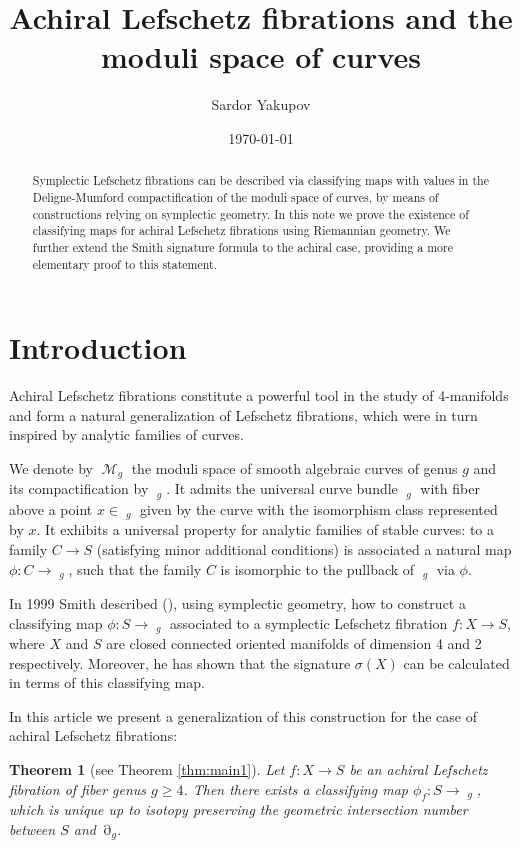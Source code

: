 \documentclass{article}
\title{Achiral Lefschetz fibrations and the moduli space of curves}
\author{Sardor Yakupov}
\date{\today}
\DeclareMathOperator{\dm}{\overline{\mathcal{M}}}
\DeclareMathOperator{\m}{\mathcal{M}}
\DeclareMathOperator{\scr}{\overline{\mathcal{C}}}
\DeclareMathOperator{\sdiv}{\partial \dm}
\theoremstyle{plain}
\newtheorem{theorem}{Theorem}
\theoremstyle{remark}
\theoremstyle{definition}
\begin{document}
\maketitle
\begin{abstract}
Symplectic Lefschetz fibrations can be described via classifying maps with values in the Deligne-Mumford compactification of the moduli space of curves, by means of constructions relying on symplectic geometry. In this note we prove the existence of classifying maps for achiral Lefschetz fibrations using Riemannian geometry. We further extend the Smith signature formula to the achiral case, providing a more elementary proof to this statement.
\end{abstract}
\tableofcontents
\newpage
\section{Introduction}
Achiral Lefschetz fibrations constitute a powerful tool in the study of 4-manifolds and form a natural generalization of Lefschetz fibrations, which were in turn inspired by analytic families of curves. \par 
We denote by $\m_g$ the moduli space of smooth algebraic curves of genus $g$ and its compactification by $\dm_g$. It admits the universal curve bundle $\scr_g$ with fiber above a point $x\in \dm_g$ given by the curve with the isomorphism class represented by $x$. It exhibits a universal property for analytic families of stable curves\thinspace: to a family $C\to S$ (satisfying minor additional conditions) is associated a natural map $\phi:C\to \dm_g$, such that the family $C$ is isomorphic to the pullback of $\scr_g$ via $\phi$.\par 
In 1999 Smith described (\cite{Smith1}), using symplectic geometry, how to construct a classifying map $\phi: S\to \dm_g$ associated to a symplectic Lefschetz fibration $f:X\to S$, where $X$ and $S$ are closed connected oriented manifolds of dimension 4 and 2 respectively. Moreover, he has shown that the signature $\sigma(X)$ can be calculated in terms of this classifying map. \par 
In this article we present a generalization of this construction for the case of achiral Lefschetz fibrations\thinspace:
\begin{theorem}[see Theorem \ref{thm:main1}]
    Let $f:X\to S$ be an achiral Lefschetz fibration of fiber genus $g\geq 4$. Then there exists a classifying map $\phi_f: S\to \dm_g$, which is unique up to isotopy preserving the geometric intersection number between $S$ and $\sdiv_g$.
\end{theorem}
\end{document}
